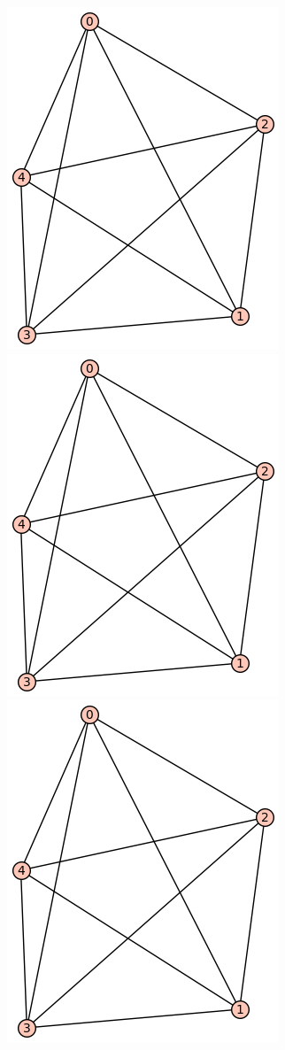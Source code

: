 \documentclass[12pt, letterpaper, twoside]{article}
\begin{document}
\includegraphics[scale=.35]{test}
\includegraphics[scale=.35]{test}
\includegraphics[scale=.35]{test}
\end{document}
